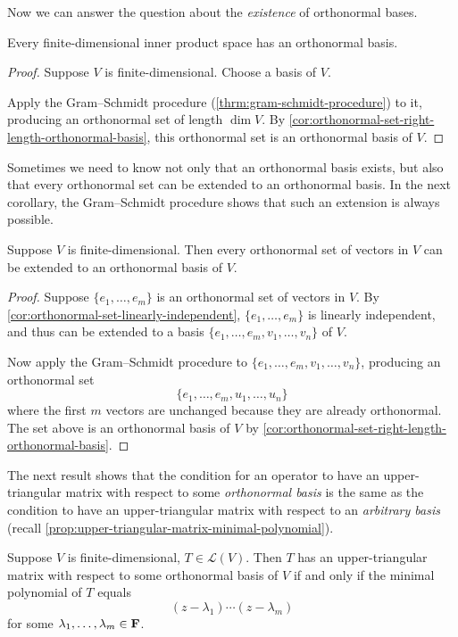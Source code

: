 Now we can answer the question about the \emph{existence} of orthonormal bases.

\begin{corollary}
Every finite-dimensional inner product space has an orthonormal basis.
\end{corollary}

\begin{proof}
Suppose $V$ is finite-dimensional. Choose a basis of $V$. 

Apply the Gram--Schmidt procedure (\ref{thrm:gram-schmidt-procedure}) to it, producing an orthonormal set of length $\dim V$.
By \ref{cor:orthonormal-set-right-length-orthonormal-basis}, this orthonormal set is an orthonormal basis of $V$.
\end{proof}

Sometimes we need to know not only that an orthonormal basis exists, but also that every orthonormal set can be extended to an orthonormal basis. 
In the next corollary, the Gram--Schmidt procedure shows that such an extension is always possible.

\begin{corollary}
Suppose $V$ is finite-dimensional. Then every orthonormal set of vectors in $V$ can be extended to an orthonormal basis of $V$.
\end{corollary}

\begin{proof}
Suppose $\{e_1,\dots,e_m\}$ is an orthonormal set of vectors in $V$. By \ref{cor:orthonormal-set-linearly-independent}, $\{e_1,\dots,e_m\}$ is linearly independent, and thus can be extended to a basis $\{e_1,\dots,e_m,v_1,\dots,v_n\}$ of $V$.

Now apply the Gram--Schmidt procedure to $\{e_1,\dots,e_m,v_1,\dots,v_n\}$, producing an orthonormal set
\[\{e_1,\dots,e_m,u_1,\dots,u_n\}\]
where the first $m$ vectors are unchanged because they are already orthonormal. The set above is an orthonormal basis of $V$ by \ref{cor:orthonormal-set-right-length-orthonormal-basis}.
\end{proof}

The next result shows that the condition for an operator to have an upper-triangular matrix with respect to some \emph{orthonormal basis} is the same as the condition to have an upper-triangular matrix with respect to an \emph{arbitrary basis} (recall \ref{prop:upper-triangular-matrix-minimal-polynomial}).

\begin{proposition}\label{prop:upper-triangular-matrix-orthonormal-basis}
Suppose $V$ is finite-dimensional, $T\in\mathcal{L}(V)$. Then $T$ has an upper-triangular matrix with respect to some orthonormal basis of $V$ if and only if the minimal polynomial of $T$ equals
\[(z-\lambda_1)\cdots(z-\lambda_m)\]
for some $\lambda_1,\dots,\lambda_m\in\mathbf F$.
\end{proposition}

